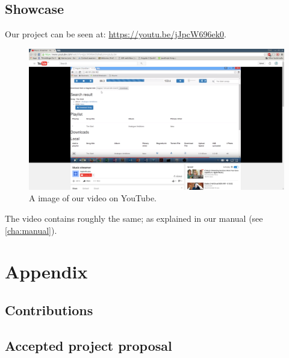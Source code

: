 \documentclass[ twoside,openright,titlepage,numbers=noenddot,headinclude,%
                footinclude=true,cleardoublepage=empty,abstractoff, %
                BCOR=5mm,paper=a4,fontsize=11pt,%
                ngerman,american,%
                ]{scrreprt}
\begin{document}
\chapter{Showcase}
Our project can be seen at: \url{https://youtu.be/jJpcW696ek0}.

\begin{figure}[H]
  \centering
    \includegraphics[width=\linewidth]{gfx/YouTube}
  \caption{A image of our video on YouTube.}
  \label{fig:angular-interface}
\end{figure}
The video contains roughly the same; as explained in our manual (see
\ref{cha:manual}).

\appendix
\cleardoublepage
\part{Appendix}
\chapter{Contributions}
\label{sec:appendix-contributions}


\chapter{Accepted project proposal}
\label{sec:appendix-project}


\cleardoublepage
\cleardoublepage
\end{document}
